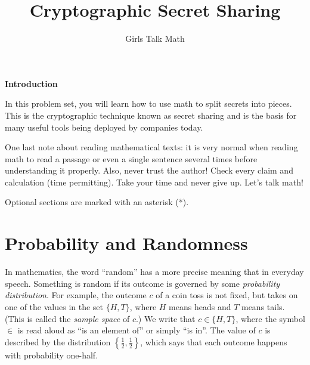 \documentclass[12 pt]{article}
\title{Cryptographic Secret Sharing}
\author{Girls Talk Math}
\date{}
\newcounter{exercise}[section]
\newcounter{example}[section]
\begin{document}
\maketitle
\vskip 1in
\begin{center} \textbf{Introduction} \end{center}

\indent In this problem set, you will learn how to use math to split secrets into pieces. This is the cryptographic technique known as secret sharing and is the basis for many useful tools being deployed by companies today.

One last note about reading mathematical texts: it is very normal when reading math to read a passage or even a single sentence several times before understanding it properly. Also, never trust the author! Check every claim and calculation (time permitting). Take your time and never give up. Let's talk math!

\newpage

\tableofcontents
\vspace*{\fill}
Optional sections are marked with an asterisk (*).



\newpage


\section{Probability and Randomness}\label{sec:prob}

In mathematics, the word ``random'' has a more precise meaning that in everyday 
speech. Something is random if its outcome is governed by some \emph{probability 
distribution}. For example, the outcome $c$ of a coin toss is not fixed, but takes 
on one of the values in the set $\{H, T\}$, where $H$ means heads and $T$ means 
tails. (This is called the \emph{sample space} of $c$.) We write 
that $c \in \{H,T\}$, where the symbol $\in$ is read aloud as 
``is an element of'' or simply ``is in''.
The value of $c$ is described by the distribution $\left\{\frac{1}{2}, 
\frac{1}{2}\right\}$, which says that each outcome happens with 
probability one-half.
\end{document}
